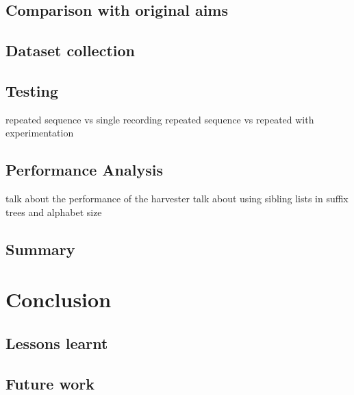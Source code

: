 \documentclass[12pt,twoside,notitlepage]{report}
\begin{document}
	\section{Comparison with original aims}
	
	\section{Dataset collection}

	\section{Testing}
		repeated sequence vs single recording
		repeated sequence vs repeated with experimentation
	
	\section{Performance Analysis}
	talk about the performance of the harvester
	talk about using sibling lists in suffix trees and alphabet size
	
	\section{Summary}
	
\cleardoublepage
\chapter{Conclusion}
	\section{Lessons learnt}
	\section{Future work}

\cleardoublepage

\end{document}
